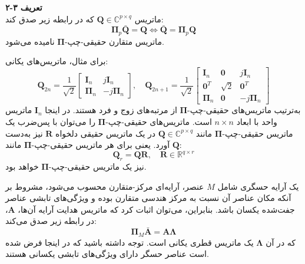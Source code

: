 \textbf{تعریف ۳-۲} \\
ماتریس $\bm{Q} \in \mathbb{C}^{p \times q}$ که در رابطه زیر صدق کند:
\begin{equation}
	\bm{\Pi}_p \bar{\bm{Q}} = \bm{Q} \iff \bar{\bm{Q}} = \bm{\Pi}_p \bm{Q}
	\label{eq:3-16}
\end{equation}
ماتریس متقارن حقیقی-چپ-$\bm{\Pi}$ نامیده می‌شود.

برای مثال، ماتریس‌های یکانی:
\begin{equation}
	\bm{Q}_{2n} = \frac{1}{\sqrt{2}} 
	\begin{bmatrix}
		\bm{I}_n & j\bm{I}_n \\
		\bm{\Pi}_n & -j\bm{\Pi}_n
	\end{bmatrix}
	, \quad 
	\bm{Q}_{2n+1} = \frac{1}{\sqrt{2}} 
	\begin{bmatrix}
		\bm{I}_n & \bm{0} & j\bm{I}_n \\
		\bm{0}^T & \sqrt{2} & \bm{0}^T \\
		\bm{\Pi}_n & \bm{0} & -j\bm{\Pi}_n
	\end{bmatrix}
	\label{eq:3-17}
\end{equation}
به‌ترتیب ماتریس‌های حقیقی-چپ-$\bm{\Pi}$ از مرتبه‌های زوج و فرد هستند. در اینجا $\bm{I}_n$ ماتریس واحد با ابعاد $n \times n$ است. ماتریس‌های حقیقی-چپ-$\bm{\Pi}$ را می‌توان با پس‌ضرب یک ماتریس حقیقی-چپ-$\bm{\Pi}$ مانند $\bm{Q} \in \mathbb{C}^{p \times q}$ در یک ماتریس حقیقی دلخواه $\bm{R}$ نیز به‌دست آورد. یعنی برای هر ماتریس حقیقی-چپ-$\bm{\Pi}$ مانند $\bm{Q}$:
\begin{equation}
	\bm{Q}_r = \bm{QR}, \quad \bm{R} \in \mathbb{R}^{q \times r}
	\label{eq:3-18}
\end{equation}
نیز یک ماتریس حقیقی-چپ-$\bm{\Pi}$ خواهد بود.




\begin{definition}
	یک آرایه حسگری شامل $M$ عنصر، آرایه‌ای مرکز-متقارن محسوب می‌شود، مشروط بر آنکه مکان عناصر آن نسبت به مرکز هندسی متقارن بوده و ویژگی‌های تابشی عناصر جفت‌شده یکسان باشد. بنابراین، می‌توان اثبات کرد که ماتریس هدایت آرایه آن‌ها، $\bm{A}$، در رابطه زیر صدق می‌کند:
	\begin{equation}
		\bm{\Pi}_M \bar{\bm{A}} = \bm{A} \bm{\Lambda}
		\label{eq:3-19}
	\end{equation}
	که در آن $\bm{\Lambda}$ یک ماتریس قطری یکانی است. توجه داشته باشید که در اینجا فرض شده است عناصر حسگر دارای ویژگی‌های تابشی یکسانی هستند.
\end{definition}

